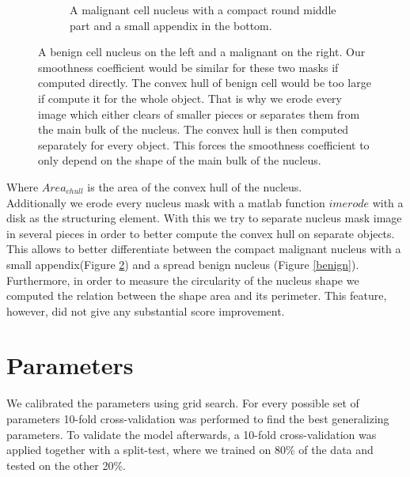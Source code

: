\documentclass[a4paper, 11pt]{article}
\begin{document}
\begin{figure}[!t!]
\begin{subfigure}[b]{0.4\textwidth}
	\caption{A malignant cell nucleus with a compact round middle part and a small appendix in the bottom.}
	\label{malignant}
\end{subfigure}
\caption{A benign cell nucleus on the left and a malignant on the right. Our smoothness coefficient would be similar for these two masks if computed directly. The convex hull of benign cell would be too large if compute it for the whole object. That is why we erode every image which either clears of smaller pieces or separates them from the main bulk of the nucleus. The convex hull is then computed separately for every object. This forces the smoothness coefficient to only depend on the shape of the main bulk of the nucleus. }
\end{figure}



Where $Area_{chull}$ is the area of the convex hull of the nucleus.\\
Additionally we erode every nucleus mask with a matlab function $imerode$ with a disk as the structuring element. With this we try to separate nucleus mask image in several pieces in order to better compute the convex hull on separate objects. This allows to better differentiate between the compact malignant nucleus with a small appendix(Figure \ref{malignant}) and a spread benign nucleus (Figure \ref{benign}).\\

Furthermore, in order to measure the circularity of the nucleus shape we computed the relation between the shape area and its perimeter. This feature, however, did not give any substantial score improvement.\\

\section{Parameters}
We calibrated the parameters using grid search. For every possible set of parameters 10-fold cross-validation was performed to find the best generalizing parameters. To validate the model afterwards, a 10-fold cross-validation was applied together with a split-test, where we trained on 80\% of the data and tested on the other 20\%.
\end{document}
